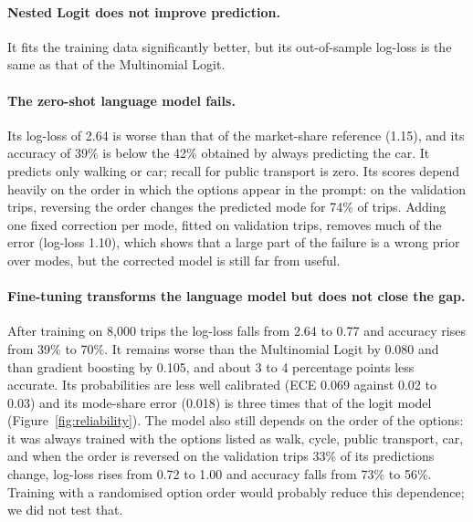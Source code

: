 \documentclass[11pt,a4paper]{article}
\newcommand{\tabpath}{tables/}
\begin{document}
\paragraph{Nested Logit does not improve prediction.} It fits the training data significantly better, but its out-of-sample log-loss is the same as that of the Multinomial Logit.

\paragraph{The zero-shot language model fails.}
Its log-loss of 2.64 is worse than that of the market-share reference (1.15), and its accuracy of 39\% is below the 42\% obtained by always predicting the car. It predicts only walking or car; recall for public transport is zero. Its scores depend heavily on the order in which the options appear in the prompt: on the validation trips, reversing the order changes the predicted mode for 74\% of trips. Adding one fixed correction per mode, fitted on validation trips, removes much of the error (log-loss 1.10), which shows that a large part of the failure is a wrong prior over modes, but the corrected model is still far from useful.

\paragraph{Fine-tuning transforms the language model but does not close the gap.}
After training on 8,000 trips the log-loss falls from 2.64 to 0.77 and accuracy rises from 39\% to 70\%. It remains worse than the Multinomial Logit by 0.080 and than gradient boosting by 0.105, and about 3 to 4 percentage points less accurate. Its probabilities are less well calibrated (ECE 0.069 against 0.02 to 0.03) and its mode-share error (0.018) is three times that of the logit model (Figure~\ref{fig:reliability}). The model also still depends on the order of the options: it was always trained with the options listed as walk, cycle, public transport, car, and when the order is reversed on the validation trips 33\% of its predictions change, log-loss rises from 0.72 to 1.00 and accuracy falls from 73\% to 56\%. Training with a randomised option order would probably reduce this dependence; we did not test that.

\begin{table}[H]
\centering\small

\caption{Paired differences in log-loss on the 4,000-trip sample, with household-bootstrap 95\% intervals (negative: model A predicts better).}
\label{tab:paired}
\end{table}
\end{document}
